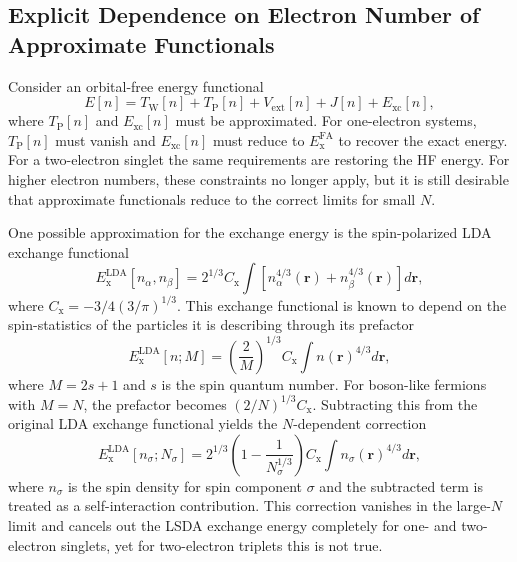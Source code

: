 \documentclass[%
 reprint,
 amsmath,amssymb,
 aps,
pra,
]{revtex4-2}
\begin{document}
\subsection{Explicit Dependence on Electron Number of Approximate Functionals}

Consider an orbital-free energy functional
\begin{equation}
    E[n]
    =
    T_{\text{W}}[n]
    +
    T_{\text{P}}[n]
    +
    V_{\text{ext}}[n]
    +
    J[n]
    +
    E_{\text{xc}}[n],
    \label{eq: OFDFT Energy}
\end{equation}
where $T_{\text{P}}[n]$ and $E_{\text{xc}}[n]$ must be approximated. For one-electron systems, $T_{\text{P}}[n]$ must vanish and $E_{\text{xc}}[n]$ must reduce to $E_{\text{x}}^{\text{FA}}$ to recover the exact energy. For a two-electron singlet the same requirements are restoring the HF energy. For higher electron numbers, these constraints no longer apply, but it is still desirable that approximate functionals reduce to the correct limits for small $N$.

One possible approximation for the exchange energy is the spin-polarized LDA exchange functional
\begin{equation}
    E_{\text{x}}^{\text{LDA}}[n_{\alpha}, n_{\beta}]
    =
    2^{1/3}
    C_{\text{x}}
    \int
    \left[
    n^{4/3}_{\alpha}(\mathbf{r}) + n^{4/3}_{\beta}(\mathbf{r})
    \right]
    d\mathbf{r},
    \label{eq: LDA Exchange}
\end{equation}
where $C_{\text{x}}=-3/4(3/\pi)^{1/3}$. This exchange functional is known to depend on the spin-statistics of the particles it is describing through its prefactor
\begin{equation}
    E_{\text{x}}^{\text{LDA}}[n; M]
    =
    \left(
    \frac{2}{M}
    \right)^{1/3}
    C_{\text{x}}
    \int
    n(\mathbf{r})^{4/3}
    d\mathbf{r},
\end{equation}
where $M = 2s+1$ and $s$ is the spin quantum number. For boson-like fermions with $M=N$, the prefactor becomes $(2/N)^{1/3}C_{\text{x}}$. Subtracting this from the original LDA exchange functional yields the $N$-dependent correction
\begin{equation}
    E_{\text{x}}^{\text{LDA}}[n_{\sigma}; N_{\sigma}]
    =
    2^{1/3}
    \left(
    1
    -
    \frac{1}{N^{1/3}_{\sigma}}
    \right)
    C_{\text{x}}
    \int
    n_{\sigma}(\mathbf{r})^{4/3}
    d\mathbf{r},
\end{equation}
where $n_{\sigma}$ is the spin density for spin component $\sigma$ and the subtracted term is treated as a self-interaction contribution. This correction vanishes in the large-$N$ limit and cancels out the LSDA exchange energy completely for one- and two-electron singlets, yet for two-electron triplets this is not true. 
\end{document}
